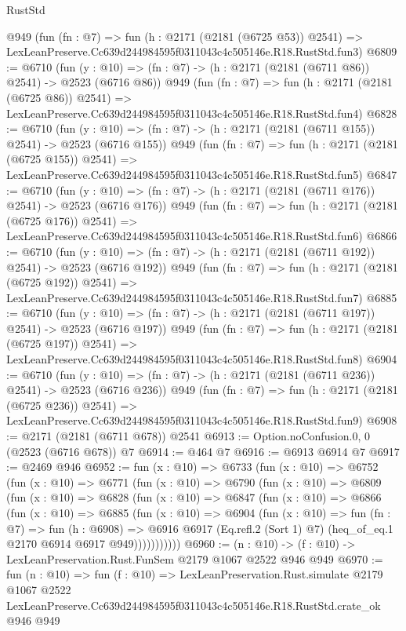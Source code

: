 \begin{lexlean}{RustStd}
\begin{coremodule}
    @949
    (fun (fn : @7) =>
    fun (h : @2171 (@2181 (@6725 @53)) @2541) =>
    LexLeanPreserve.Cc639d244984595f0311043c4c505146e.R18.RustStd.fun3)
@6809 := @6710
    (fun (y : @10) => (fn : @7) -> (h : @2171 (@2181 (@6711 @86)) @2541) -> @2523 (@6716 @86))
    @949
    (fun (fn : @7) =>
    fun (h : @2171 (@2181 (@6725 @86)) @2541) =>
    LexLeanPreserve.Cc639d244984595f0311043c4c505146e.R18.RustStd.fun4)
@6828 := @6710
    (fun (y : @10) => (fn : @7) -> (h : @2171 (@2181 (@6711 @155)) @2541) -> @2523 (@6716 @155))
    @949
    (fun (fn : @7) =>
    fun (h : @2171 (@2181 (@6725 @155)) @2541) =>
    LexLeanPreserve.Cc639d244984595f0311043c4c505146e.R18.RustStd.fun5)
@6847 := @6710
    (fun (y : @10) => (fn : @7) -> (h : @2171 (@2181 (@6711 @176)) @2541) -> @2523 (@6716 @176))
    @949
    (fun (fn : @7) =>
    fun (h : @2171 (@2181 (@6725 @176)) @2541) =>
    LexLeanPreserve.Cc639d244984595f0311043c4c505146e.R18.RustStd.fun6)
@6866 := @6710
    (fun (y : @10) => (fn : @7) -> (h : @2171 (@2181 (@6711 @192)) @2541) -> @2523 (@6716 @192))
    @949
    (fun (fn : @7) =>
    fun (h : @2171 (@2181 (@6725 @192)) @2541) =>
    LexLeanPreserve.Cc639d244984595f0311043c4c505146e.R18.RustStd.fun7)
@6885 := @6710
    (fun (y : @10) => (fn : @7) -> (h : @2171 (@2181 (@6711 @197)) @2541) -> @2523 (@6716 @197))
    @949
    (fun (fn : @7) =>
    fun (h : @2171 (@2181 (@6725 @197)) @2541) =>
    LexLeanPreserve.Cc639d244984595f0311043c4c505146e.R18.RustStd.fun8)
@6904 := @6710
    (fun (y : @10) => (fn : @7) -> (h : @2171 (@2181 (@6711 @236)) @2541) -> @2523 (@6716 @236))
    @949
    (fun (fn : @7) =>
    fun (h : @2171 (@2181 (@6725 @236)) @2541) =>
    LexLeanPreserve.Cc639d244984595f0311043c4c505146e.R18.RustStd.fun9)
@6908 := @2171 (@2181 (@6711 @678)) @2541
@6913 := Option.noConfusion.{0, 0} (@2523 (@6716 @678)) @7
@6914 := @464 @7
@6916 := @6913 @6914 @7
@6917 := @2469 @946
@6952 := fun (x : @10) =>
  @6733
    (fun (x : @10) =>
    @6752
      (fun (x : @10) =>
      @6771
        (fun (x : @10) =>
        @6790
          (fun (x : @10) =>
          @6809
            (fun (x : @10) =>
            @6828
              (fun (x : @10) =>
              @6847
                (fun (x : @10) =>
                @6866
                  (fun (x : @10) =>
                  @6885
                    (fun (x : @10) =>
                    @6904
                      (fun (x : @10) =>
                      fun (fn : @7) =>
                      fun (h : @6908) =>
                      @6916
                        @6917
                        (Eq.refl.{2} (Sort 1) @7)
                        (heq_of_eq.{1} @2170 @6914 @6917 @949)))))))))))
@6960 := (n : @10) -> (f : @10) -> LexLeanPreservation.Rust.FunSem @2179 @1067 @2522 @946 @949
@6970 := fun (n : @10) =>
  fun (f : @10) =>
  LexLeanPreservation.Rust.simulate
    @2179
    @1067
    @2522
    LexLeanPreserve.Cc639d244984595f0311043c4c505146e.R18.RustStd.crate_ok
    @946
    @949
\end{coremodule}
\end{lexlean}
